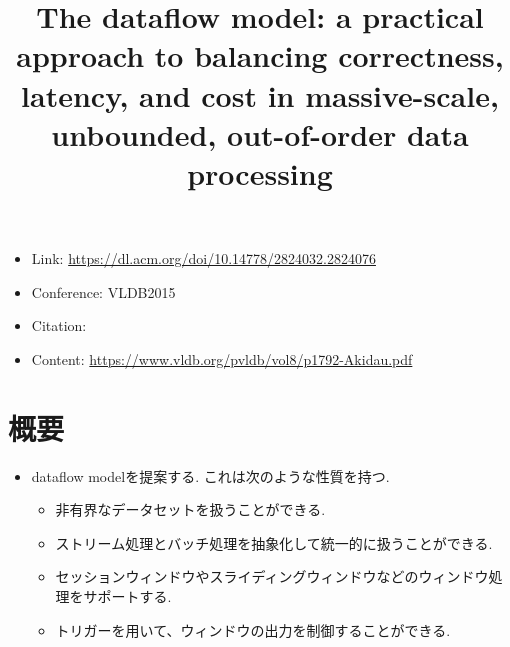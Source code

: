 \documentclass[dvipdfmx,uplatex]{jsarticle}
\title{The dataflow model: a practical approach to balancing correctness, latency, and cost in massive-scale, unbounded, out-of-order data processing}
\author{\empty}
\date{\empty}
\theoremstyle{remark}
\newenvironment{simplebox}{
    \begin{tcolorbox}[
        fonttitle=\bfseries,
    ]
}{
    \end{tcolorbox}
}
\begin{document}
\maketitle

\begin{itemize}
    \item Link: \url{https://dl.acm.org/doi/10.14778/2824032.2824076}
    \item Conference: VLDB2015
    \item Citation: \cite{dataflow-model}
    \item Content: \url{https://www.vldb.org/pvldb/vol8/p1792-Akidau.pdf}
\end{itemize}

\section{概要}
\begin{simplebox}
\begin{itemize}
    \item dataflow modelを提案する. これは次のような性質を持つ.
    \begin{itemize}
        \item 非有界なデータセットを扱うことができる.
        \item ストリーム処理とバッチ処理を抽象化して統一的に扱うことができる.
        \item セッションウィンドウやスライディングウィンドウなどのウィンドウ処理をサポートする.
        \item トリガーを用いて、ウィンドウの出力を制御することができる.
    \end{itemize}
\end{itemize}
\end{simplebox}
\end{document}
